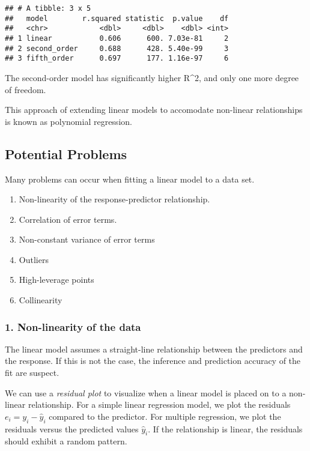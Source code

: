 \documentclass[]{book}
\providecommand{\tightlist}{%
  \setlength{\itemsep}{0pt}\setlength{\parskip}{0pt}}
\begin{document}
\begin{verbatim}
## # A tibble: 3 x 5
##   model        r.squared statistic  p.value    df
##   <chr>            <dbl>     <dbl>    <dbl> <int>
## 1 linear           0.606      600. 7.03e-81     2
## 2 second_order     0.688      428. 5.40e-99     3
## 3 fifth_order      0.697      177. 1.16e-97     6
\end{verbatim}

The second-order model has significantly higher R\^{}2, and only one more degree of freedom.

This approach of extending linear models to accomodate non-linear relationships is known as polynomial regression.

\hypertarget{potential-problems}{%
\subsection{Potential Problems}\label{potential-problems}}

Many problems can occur when fitting a linear model to a data set.

\begin{enumerate}
\def\labelenumi{\arabic{enumi}.}
\tightlist
\item
  Non-linearity of the response-predictor relationship.
\item
  Correlation of error terms.
\item
  Non-constant variance of error terms
\item
  Outliers
\item
  High-leverage points
\item
  Collinearity
\end{enumerate}

\hypertarget{non-linearity-of-the-data}{%
\subsubsection{1. Non-linearity of the data}\label{non-linearity-of-the-data}}

The linear model assumes a straight-line relationship between the predictors and the response. If this is not the case, the inference and prediction accuracy of the fit are suspect.

We can use a \emph{residual plot} to visualize when a linear model is placed on to a non-linear relationship. For a simple linear regression model, we plot the residuals \(e_i = y_i - \hat{y}_i\) compared to the predictor. For multiple regression, we plot the residuals versus the predicted values \(\hat{y}_i\). If the relationship is linear, the residuals should exhibit a random pattern.
\end{document}
